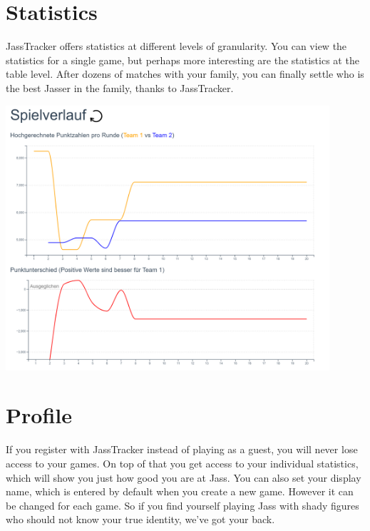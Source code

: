 \section*{Statistics}
JassTracker offers statistics at different levels of granularity. You can view the statistics for a single game, but perhaps more interesting are the statistics at the table level. After dozens of matches with your family, you can finally settle who is the best Jasser in the family, thanks to JassTracker.

\includegraphics[width=0.9\textwidth]{resources/screenshots/statistics}

\section*{Profile}
If you register with JassTracker instead of playing as a guest, you will never lose access to your games. On top of that you get access to your individual statistics, which will show you just how good you are at Jass. You can also set your display name, which is entered by default when you create a new game. However it can be changed for each game. So if you find yourself playing Jass with shady figures who should not know your true identity, we've got your back.

